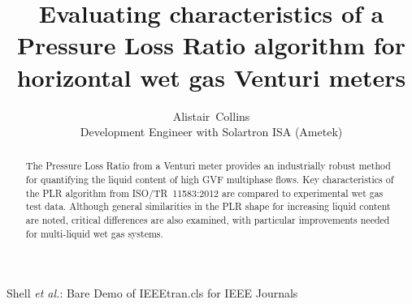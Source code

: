 \documentclass[journal]{IEEEtran}
\begin{document}
%
\title{Evaluating characteristics of a Pressure Loss Ratio algorithm for horizontal wet gas Venturi meters
}
%
%
%

\author{Alistair~Collins\\
Development Engineer with Solartron ISA (Ametek)
}


%
{Shell \MakeLowercase{\textit{et al.}}: Bare Demo of IEEEtran.cls for IEEE Journals}
% 











\maketitle

\begin{abstract}
The Pressure Loss Ratio from a Venturi meter provides an industrially robust method for quantifying the liquid content of high GVF multiphase flows. Key characteristics of the PLR algorithm from ISO/TR~11583:2012 are compared to experimental wet gas test data. Although general similarities in the PLR shape for increasing liquid content are noted, critical differences are also examined, with particular improvements needed for multi-liquid wet gas systems.
\end{abstract}
\end{document}
